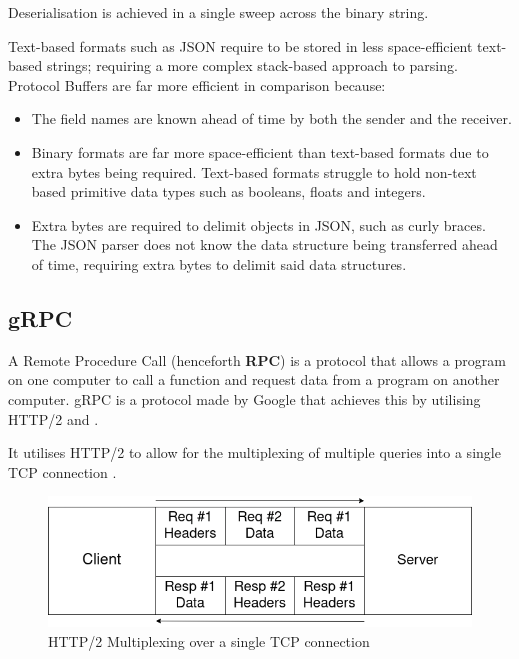 \documentclass[a4paper,12pt]{report}
\begin{document}
Deserialisation is achieved in a single sweep across the binary string.

Text-based formats such as JSON \cite{json} require to be stored in less space-efficient text-based strings; requiring a more complex stack-based approach to parsing. 
Protocol Buffers are far more efficient in comparison because:

\begin{itemize}
    \item The field names are known ahead of time by both the sender and the receiver.
    \item Binary formats are far more space-efficient than text-based formats due to extra bytes being required. Text-based formats struggle to hold non-text based primitive data types such as booleans, floats and integers.
    \item Extra bytes are required to delimit objects in JSON, such as curly braces. The JSON parser does not know the data structure being transferred ahead of time, requiring extra bytes to delimit said data structures.
\end{itemize}

\subsection{gRPC}
\label{sec:grpc}

A Remote Procedure Call (henceforth \textbf{RPC}) is a protocol that allows a program on one computer to call a function and request data from a program on another computer.
gRPC is a protocol made by Google that achieves this by utilising HTTP/2 \cite{http2} and \textit{}.

It utilises HTTP/2 to allow for the multiplexing of multiple queries into a single TCP connection \cite{tcp}.

\begin{figure}[hbt!]
    \centering
    \includegraphics[width=\linewidth]{http2.png}
    \caption{HTTP/2 Multiplexing over a single TCP connection}
    \label{fig:2}
\end{figure}
\end{document}

